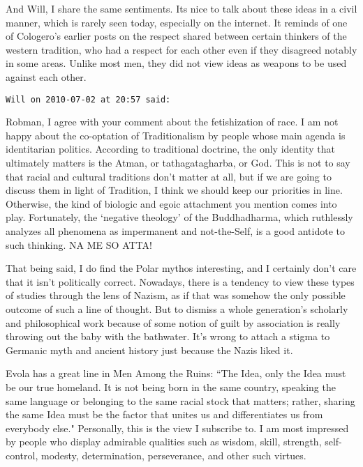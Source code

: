 \begin{footnotesize}
\begin{sffamily}
And Will, I share the same sentiments. Its nice to talk about these ideas in a civil manner, which is rarely seen today, especially on the internet. It reminds of one of Cologero's earlier posts on the respect shared between certain thinkers of the western tradition, who had a respect for each other even if they disagreed notably in some areas. Unlike most men, they did not view ideas as weapons to be used against each other.


\hfill

\texttt{Will on 2010-07-02 at 20:57 said: }

Robman, I agree with your comment about the fetishization of race. I am not happy about the co-optation of Traditionalism by people whose main agenda is identitarian politics. According to traditional doctrine, the only identity that ultimately matters is the Atman, or tathagatagharba, or God. This is not to say that racial and cultural traditions don't matter at all, but if we are going to discuss them in light of Tradition, I think we should keep our priorities in line. Otherwise, the kind of biologic and egoic attachment you mention comes into play. Fortunately, the `negative theology' of the Buddhadharma, which ruthlessly analyzes all phenomena as impermanent and not-the-Self, is a good antidote to such thinking. NA ME SO ATTA!

That being said, I do find the Polar mythos interesting, and I certainly don't care that it isn't politically correct. Nowadays, there is a tendency to view these types of studies through the lens of Nazism, as if that was somehow the only possible outcome of such a line of thought. But to dismiss a whole generation's scholarly and philosophical work because of some notion of guilt by association is really throwing out the baby with the bathwater. It's wrong to attach a stigma to Germanic myth and ancient history just because the Nazis liked it. 

Evola has a great line in Men Among the Ruins: ``The Idea, only the Idea must be our true homeland. It is not being born in the same country, speaking the same language or belonging to the same racial stock that matters; rather, sharing the same Idea must be the factor that unites us and differentiates us from everybody else." Personally, this is the view I subscribe to. I am most impressed by people who display admirable qualities such as wisdom, skill, strength, self-control, modesty, determination, perseverance, and other such virtues.


\hfill


\end{sffamily}
\end{footnotesize}
